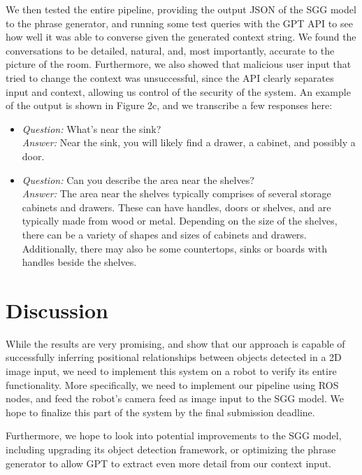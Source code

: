 \documentclass[letterpaper, 10 pt, conference]{ieeeconf}  %
\begin{document}
\begin{figure}
    \end{figure}

    We then tested the entire pipeline, providing the output JSON of the SGG model to the phrase generator, and running some test queries with the GPT API to see how well it was able to converse given the generated context string. We found the conversations to be detailed, natural, and, most importantly, accurate to the picture of the room. Furthermore, we also showed that malicious user input that tried to change the context was unsuccessful, since the API clearly separates input and context, allowing us control of the security of the system. An example of the output is shown in Figure 2c, and we transcribe a few responses here:
    \begin{itemize}
        \item \textit{Question:} What's near the sink? \\ \textit{Answer:} Near the sink, you will likely find a drawer, a cabinet, and possibly a door.
        \item \textit{Question:} Can you describe the area near the shelves? \\ \textit{Answer:} The area near the shelves typically comprises of several storage cabinets and drawers. These can have handles, doors or shelves, and are typically made from wood or metal. Depending on the size of the shelves, there can be a variety of shapes and sizes of cabinets and drawers. Additionally, there may also be some countertops, sinks or boards with handles beside the shelves.
    \end{itemize}

\section{Discussion}
    While the results are very promising, and show that our approach is capable of successfully inferring positional relationships between objects detected in a 2D image input, we need to implement this system on a robot to verify its entire functionality. More specifically, we need to implement our pipeline using ROS nodes, and feed the robot's camera feed as image input to the SGG model. We hope to finalize this part of the system by the final submission deadline.

    Furthermore, we hope to look into potential improvements to the SGG model, including upgrading its object detection framework, or optimizing the phrase generator to allow GPT to extract even more detail from our context input.
\end{document}
